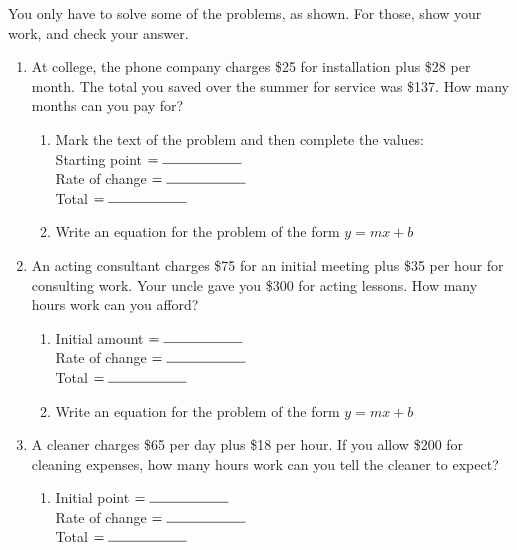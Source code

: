 \documentclass[12pt, oneside]{article}
\begin{document}
  You only have to solve some of the problems, as shown. For those, show your work, and check your answer.
  \begin{enumerate}
    \subsubsection*{Classwork: Word problem Wednesday}

  \item At college, the phone company charges \$25 for installation plus \$28 per month. The total you saved over the summer for service was \$137. How many months can you pay for?
  \begin{enumerate}
    \item Mark the text of the problem and then complete the values:\\[0.5cm]
    Starting point $= \rule{2cm}{0.15mm}$ \\[0.5cm]
    Rate of change $= \rule{2cm}{0.15mm}$ \\[0.5cm]
    Total $= \rule{2cm}{0.15mm}$ \\

    \item Write an equation for the problem of the form $y=mx+b$\\[3cm]

  \end{enumerate}

  \item An acting consultant charges \$75 for an initial meeting plus \$35 per hour for consulting work. Your uncle gave you \$300 for acting lessons. How many hours work can you afford?
  \begin{enumerate}
    \item Initial amount $= \rule{2cm}{0.15mm}$ \\[0.5cm]
    Rate of change $= \rule{2cm}{0.15mm}$ \\[0.5cm]
    Total $= \rule{2cm}{0.15mm}$ \\

    \item Write an equation for the problem of the form $y=mx+b$\\[1.5cm]
  \end{enumerate}

\newpage

  \item A cleaner charges \$65 per day plus \$18 per hour. If you allow \$200 for cleaning expenses, how many hours work can you tell the cleaner to expect?
  \begin{enumerate}
    \item Initial point $= \rule{2cm}{0.15mm}$ \\[0.5cm]
    Rate of change $= \rule{2cm}{0.15mm}$ \\[0.5cm]
    Total $= \rule{2cm}{0.15mm}$ \\


\end{enumerate}
\end{enumerate}
\end{document}
